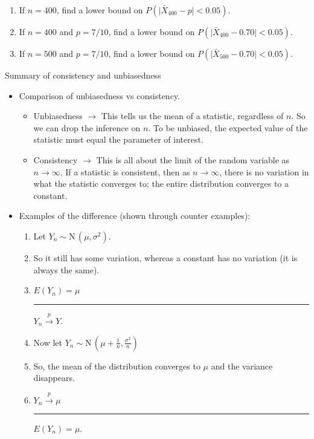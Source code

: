 \documentclass{article}
\newcommand{\blankul}[1]{\rule[-1.5mm]{#1}{0.15mm}}	%
\newcommand{\follow}[1]{\sim \text{#1}\,}		%
\newcommand{\convp}[2]{#1 \overset{p} \to #2}		%
\begin{document}
\begin{itemize}
\begin{itemize}
\begin{enumerate}
            \item If $n = 400$, find a lower bound on $P(\lvert \bar{X}_{400} - p \rvert < 0.05)$.\vspace{40pt}
            \item If $n = 400$ and $p = 7/10$, find a lower bound on $P(\lvert \bar{X}_{400} - 0.70 \rvert < 0.05)$.\vspace{40pt}
            \item If $n = 500$ and $p = 7/10$, find a lower bound on $P(\lvert \bar{X}_{500} - 0.70 \rvert < 0.05)$.\vspace{40pt}
        \end{enumerate}
    \end{itemize}\bigskip
\end{itemize}\bigskip
    
Summary of consistency and unbiasedness\bigskip
\begin{itemize}
    \item Comparison of unbiasedness vs consistency.
    \begin{itemize}
        \item Unbiasedness $\rightarrow$ This tells us the mean of a statistic, regardless of $n$. So we can drop the inference on $n$. To be unbiased, the expected value of the statistic must equal the parameter of interest.\vspace{20pt}
        \item Consistency $\rightarrow$ This is all about the limit of the random variable as $n \to \infty$. If a statistic is consistent, then as $n \to \infty$, there is no variation in what the statistic converges to; the entire distribution converges to a constant.\vspace{20pt}
    \end{itemize}
    \item Examples of the difference (shown through counter examples):
    \begin{enumerate}
        \item Let $Y_n \follow{N}(\mu, \sigma^2)$.\vspace{60pt}
        \item[] So it still has some variation, whereas a constant has no variation (it is always the same).
        \item[] $E(Y_n) = \mu$ \blankul{5cm} $\displaystyle \convp{Y_n}{Y}$.\bigskip
        \item Now let $Y_n \follow{N}(\mu + \frac{1}{n}, \frac{\sigma^2}{n})$\vspace{60pt}
        \item[] So, the mean of the distribution converges to $\mu$ and the variance disappears.
        \item[] $\convp{Y_n}{\mu}$ \blankul{5cm} $E(Y_n) = \mu$.
    \end{enumerate}
\end{itemize}\bigskip
\end{document}
